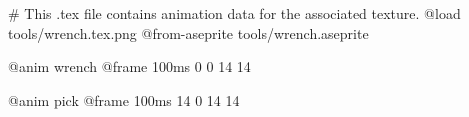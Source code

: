 # This .tex file contains animation data for the associated texture.
@load tools/wrench.tex.png
@from-aseprite tools/wrench.aseprite

@anim wrench
	@frame 100ms 0 0 14 14

@anim pick
	@frame 100ms 14 0 14 14

